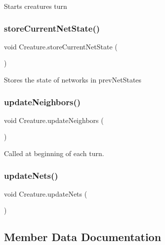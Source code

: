 Starts creatures turn 

\mbox{\label{class_creature_a372a0b61e98758214fddc2564dc649f2}} 
\subsubsection{\texorpdfstring{store\+Current\+Net\+State()}{storeCurrentNetState()}}
{\footnotesize\ttfamily void Creature.\+store\+Current\+Net\+State (\begin{DoxyParamCaption}{ }\end{DoxyParamCaption})}



Stores the state of networks in prev\+Net\+States 

\mbox{\label{class_creature_aeaf23c7008fa80ca8897d13b5435e1fc}} 
\subsubsection{\texorpdfstring{update\+Neighbors()}{updateNeighbors()}}
{\footnotesize\ttfamily void Creature.\+update\+Neighbors (\begin{DoxyParamCaption}{ }\end{DoxyParamCaption})}



Called at beginning of each turn. 

\mbox{\label{class_creature_ad9f8df80e830988e67bf3eeeb016689c}} 
\subsubsection{\texorpdfstring{update\+Nets()}{updateNets()}}
{\footnotesize\ttfamily void Creature.\+update\+Nets (\begin{DoxyParamCaption}{ }\end{DoxyParamCaption})}



\subsection{Member Data Documentation}
\mbox{\label{class_creature_a83af2d9bc8c0a8b819957c4029515b3f}} 
